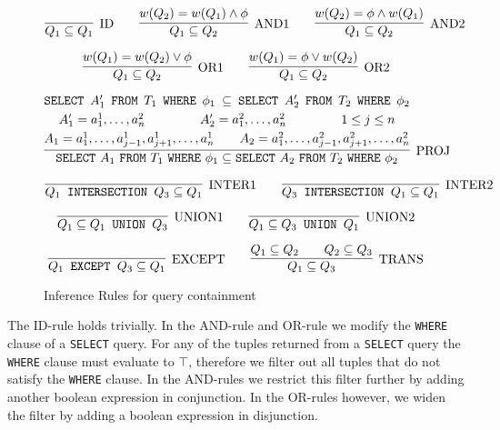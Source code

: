 \begin{figure}[!ht]
\[
\infer[\text{ID}]
	{Q_1 \subseteq Q_1}
	{}
\qquad	
\infer[\text{AND1}]
	{Q_1 \subseteq Q_2}
	{w(Q_2) = w(Q_1) \land \phi}
\qquad
\infer[\text{AND2}]
	{Q_1 \subseteq Q_2}
	{w(Q_2) = \phi \land w(Q_1)}
\]

\[
\infer[\text{OR1}]
	{Q_1 \subseteq Q_2}
	{w(Q_1) = w(Q_2) \lor \phi}
\qquad
\infer[\text{OR2}]
	{Q_1 \subseteq Q_2}
	{w(Q_1) = \phi \lor w(Q_2)}
\]

\begin{multline*}
\infer[\text{PROJ}]
	{\texttt{SELECT}\ A_1\ \texttt{FROM}\ T_1\ \texttt{WHERE}\ \phi_1 \subseteq \texttt{SELECT}\ A_2\ \texttt{FROM}\ T_2\ \texttt{WHERE}\ \phi_2}
	{
	\texttt{SELECT}\ A_1'\ \texttt{FROM}\ T_1\ \texttt{WHERE}\ \phi_1 \subseteq \texttt{SELECT}\ A_2'\ \texttt{FROM}\ T_2\ \texttt{WHERE}\ \phi_2 \\
	\hfill A_1' = a_1^1, \ldots, a_n^2 \hfill \qquad
	\hfill A_2' = a_1^2, \ldots, a_n^2 \hfill \qquad
	\hfill 1 \leq j \leq n \hfill \\
	\hfill A_1 = a_1^1, \ldots, a_{j-1}^1, a_{j+1}^1, \ldots,  a_n^1 \hfill \qquad
	\hfill A_2 = a_1^2, \ldots, a_{j-1}^2, a_{j+1}^2, \ldots, a_n^2 \hfill 	
	}
\end{multline*}

\[
\infer[\text{INTER1}]
	{Q_1 \text{\texttt{ INTERSECTION }} Q_3 \subseteq Q_1}
	{}
\qquad
\infer[\text{INTER2}]
	{Q_3 \text{\texttt{ INTERSECTION }} Q_1 \subseteq Q_1}
	{}
\]

\[
\infer[\text{UNION1}]
	{Q_1 \subseteq Q_1 \text{\texttt{ UNION }} Q_3}
	{}
\qquad
\infer[\text{UNION2}]
	{Q_1 \subseteq Q_3 \text{\texttt{ UNION }} Q_1}
	{}
\]

\[
\infer[\text{EXCEPT}]
	{Q_1 \text{\texttt{ EXCEPT }} Q_3 \subseteq Q_1}
	{}
\qquad
\infer[\text{TRANS}]
	{Q_1 \subseteq Q_3}
	{Q_1 \subseteq Q_2 \qquad Q_2 \subseteq Q_3}
\]
\caption{Inference Rules for query containment}
\label{figure:algorithms:infrules}
\end{figure}
%
The ID-rule holds trivially.
%
In the AND-rule and OR-rule we modify the \texttt{WHERE} clause of a \texttt{SELECT} query.
%
For any of the tuples returned from a \texttt{SELECT} query the \texttt{WHERE} clause must evaluate to $\top$, therefore we filter out all tuples that do not satisfy the \texttt{WHERE} clause.
%
In the AND-rules we restrict this filter further by adding another boolean expression in conjunction.
%
In the OR-rules however, we widen the filter by adding a boolean expression in disjunction.
%

